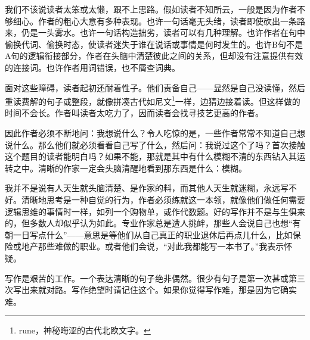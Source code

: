 我们不该说读者太笨或太懒，跟不上思路。假如读者不知所云，一般是因为作者不够细心。作者的粗心大意有多种表现。也许一句话毫无头绪，读者即使砍出一条路来，仍是一头雾水。也许一句话构造拙劣，读者可以有几种理解。也许作者在句中偷换代词、偷换时态，使读者迷失于谁在说话或事情是何时发生的。也许B句不是A句的逻辑衔接部分，作者在头脑中清楚彼此之间的关系，但却没有注意提供有效的连接词。也许作者用词错误，也不屑查词典。

面对这些障碍，读者起初还耐着性子。他们责备自己——显然是自己没读懂，然后重读费解的句子或整段，就像拼凑古代如尼文\footnote{rune，神秘晦涩的古代北欧文字。}一样，边猜边接着读。但这样做的时间不会长。作者叫读者太吃力了，因而读者会找寻技艺更高的作者。

因此作者必须不断地问：我想说什么？令人吃惊的是，一些作者常常不知道自己想说什么。那么他们就必须看看自己写了什么，然后问：我说过这个了吗？首次接触这个题目的读者能明白吗？如果不能，那就是其中有什么模糊不清的东西钻入其运转之中。清晰的作家一定会头脑清醒地看到那东西是什么：模糊。

我并不是说有人天生就头脑清楚、是作家的料，而其他人天生就迷糊，永远写不好。清晰地思考是一种自觉的行为，作者必须练就这一本领，就像他们做任何需要逻辑思维的事情时一样，如列一个购物单，或作代数题。好的写作并不是与生俱来的，但多数人却似乎认为如此。专业作家总是遭人挑衅，那些人会说自己也想“有朝一日写点什么”——意思是等他们从自己真正的职业退休后再点儿什么，比如保险或地产那些难做的职业。或者他们会说，“对此我都能写一本书了。”我表示怀疑。

写作是艰苦的工作。一个表达清晰的句子绝非偶然。很少有句子是第一次甚或第三次写出来就对路。写作绝望时请记住这个。如果你觉得写作难，那是因为它确实难。

